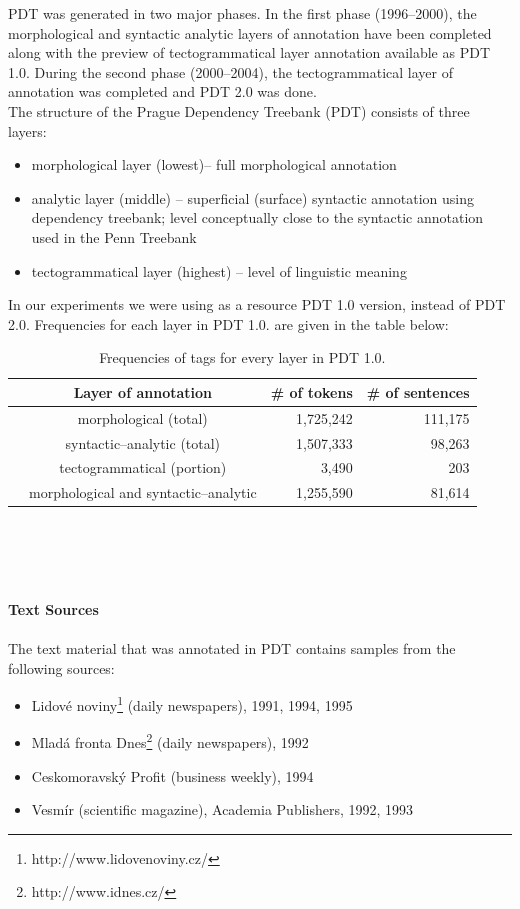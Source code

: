 PDT was generated in two major phases. In the first phase (1996--2000), the morphological and syntactic analytic  layers of annotation have been completed along with the preview of tectogrammatical layer annotation available as  PDT 1.0. During the second phase (2000--2004), the tectogrammatical layer of annotation was completed and PDT 2.0 was done.
\\The structure of the Prague Dependency Treebank (PDT) consists of three layers:
\begin{itemize}
\item morphological layer (lowest)-- full morphological annotation
\item analytic  layer (middle) -- superficial (surface) syntactic annotation using dependency treebank; level conceptually close to the syntactic annotation used in the Penn Treebank 
\item tectogrammatical layer (highest) -- level of linguistic meaning
\end{itemize}
In our experiments we were using as a resource PDT 1.0 version, instead of PDT 2.0. Frequencies for each layer in PDT 1.0. are given in the table below:
\begin{table}[h!]
\begin{center}
	\begin{tabular}{ l  c  | r r }
   	& Layer of annotation   & \# of tokens & \# of sentences \\
	\hline                       
	& morphological (total) & 1,725,242 & 111,175\\
	& syntactic--analytic (total) & 1,507,333 & 98,263 \\
  	& tectogrammatical (portion) & 3,490 &  203 \\
	& morphological and syntactic--analytic & 1,255,590 & 81,614 \\
	\end{tabular}
\end{center}
\caption{Frequencies of tags for every layer in PDT 1.0.}
\end{table}
\\\\\\\\
\textbf{Text Sources}
\\\\The text material that was annotated in PDT contains samples from the following sources:
\begin{itemize}
\item Lidov\'e noviny\footnote{http://www.lidovenoviny.cz/} (daily newspapers), 1991, 1994, 1995
\item Mlad\'a fronta Dnes\footnote{http://www.idnes.cz/} (daily newspapers), 1992
\item Ceskomoravsk\'y Profit (business weekly), 1994
\item Vesm\'ir (scientific magazine), Academia Publishers, 1992, 1993
\end{itemize}

